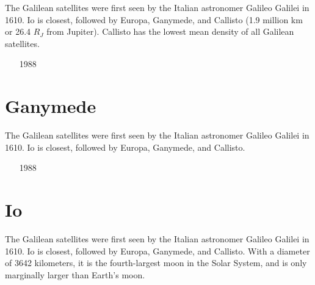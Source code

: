 The Galilean satellites were first seen by the Italian astronomer Galileo Galilei in 1610. 
Io is closest, followed by Europa, Ganymede, and Callisto (1.9 million km or
26.4 $R_J$ from Jupiter). Callisto has the lowest mean density of all Galilean satellites.

\begin{small}
\begin{itemize}
\item[1988]
\item[\twothousandfour]
\item[\twothousandfive]
\item[\twothousandsix]
\end{itemize}
\end{small}

\section{Ganymede}

The Galilean satellites were first seen by the Italian astronomer Galileo Galilei in 1610. 
Io is closest, followed by Europa, Ganymede, and Callisto.

\begin{small}
\begin{itemize}
\item[1988]
\item[\twothousandsix]
\item[\twothousandfourteen]
\end{itemize}
\end{small}


\section{Io}

The Galilean satellites were first seen by the Italian astronomer Galileo Galilei in 1610. 
Io is closest, followed by Europa, Ganymede, and Callisto.
With a diameter of 3642 kilometers, it is the fourth-largest moon in the Solar System, 
and is only marginally larger than Earth's moon.

\begin{small}
\begin{itemize}
\item[\twothousandone]
 \\ 
 \\
\item[\twothousandthirteen] 
\item[\twothousandtwenty] 
 \\ 
 \\
\item[\twothousandtwentytwo] 
\end{itemize}
\end{small}

